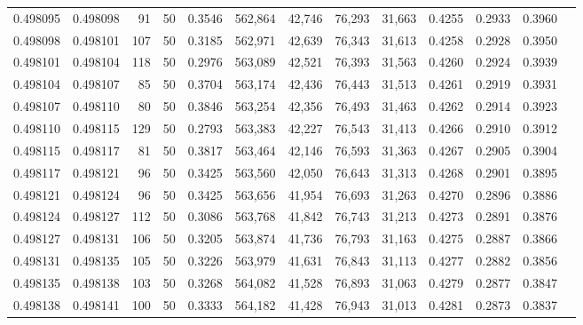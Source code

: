\begin{tabular}{rrrrrrrrrrrrr}
0.498095 & 0.498098 &    91 &  50 &                                     0.3546 & 562,864 &  42,746 &  76,293 &  31,663 & 0.4255 & 0.2933 & 0.3960 \\
0.498098 & 0.498101 &   107 &  50 &                                     0.3185 & 562,971 &  42,639 &  76,343 &  31,613 & 0.4258 & 0.2928 & 0.3950 \\
0.498101 & 0.498104 &   118 &  50 &                                     0.2976 & 563,089 &  42,521 &  76,393 &  31,563 & 0.4260 & 0.2924 & 0.3939 \\
0.498104 & 0.498107 &    85 &  50 &                                     0.3704 & 563,174 &  42,436 &  76,443 &  31,513 & 0.4261 & 0.2919 & 0.3931 \\
0.498107 & 0.498110 &    80 &  50 &                                     0.3846 & 563,254 &  42,356 &  76,493 &  31,463 & 0.4262 & 0.2914 & 0.3923 \\
0.498110 & 0.498115 &   129 &  50 &                                     0.2793 & 563,383 &  42,227 &  76,543 &  31,413 & 0.4266 & 0.2910 & 0.3912 \\
0.498115 & 0.498117 &    81 &  50 &                                     0.3817 & 563,464 &  42,146 &  76,593 &  31,363 & 0.4267 & 0.2905 & 0.3904 \\
0.498117 & 0.498121 &    96 &  50 &                                     0.3425 & 563,560 &  42,050 &  76,643 &  31,313 & 0.4268 & 0.2901 & 0.3895 \\
0.498121 & 0.498124 &    96 &  50 &                                     0.3425 & 563,656 &  41,954 &  76,693 &  31,263 & 0.4270 & 0.2896 & 0.3886 \\
0.498124 & 0.498127 &   112 &  50 &                                     0.3086 & 563,768 &  41,842 &  76,743 &  31,213 & 0.4273 & 0.2891 & 0.3876 \\
0.498127 & 0.498131 &   106 &  50 &                                     0.3205 & 563,874 &  41,736 &  76,793 &  31,163 & 0.4275 & 0.2887 & 0.3866 \\
0.498131 & 0.498135 &   105 &  50 &                                     0.3226 & 563,979 &  41,631 &  76,843 &  31,113 & 0.4277 & 0.2882 & 0.3856 \\
0.498135 & 0.498138 &   103 &  50 &                                     0.3268 & 564,082 &  41,528 &  76,893 &  31,063 & 0.4279 & 0.2877 & 0.3847 \\
0.498138 & 0.498141 &   100 &  50 &                                     0.3333 & 564,182 &  41,428 &  76,943 &  31,013 & 0.4281 & 0.2873 & 0.3837 \\

\end{tabular}
